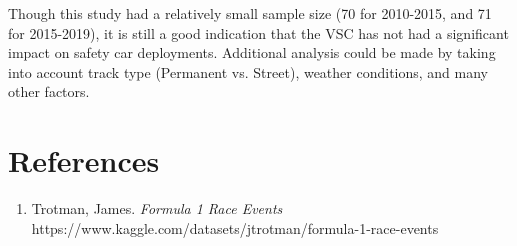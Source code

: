 \documentclass[11pt]{article}
\begin{document}
Though this study had a relatively small sample size (70 for 2010-2015, and 71 for 2015-2019), it is still a good indication that the VSC has not had a significant impact on safety car deployments. Additional analysis could be made by taking into account track type (Permanent vs. Street), weather conditions, and many other factors.

\pagebreak

\section*{References}
\begin{enumerate}
    \item Trotman, James. \textit{Formula 1 Race Events} \\
          https://www.kaggle.com/datasets/jtrotman/formula-1-race-events
\end{enumerate}
\end{document}
